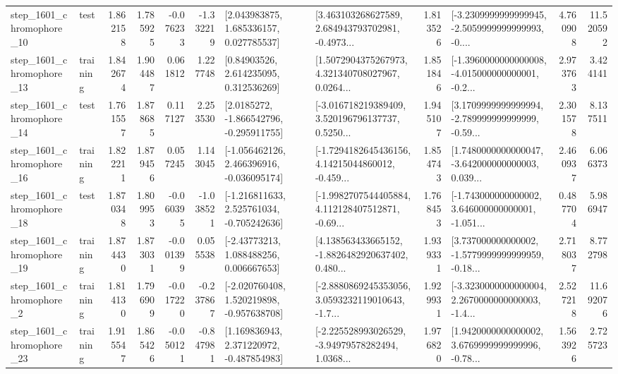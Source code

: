 \begin{tabular}{llrrrrllrlrr}
 step\_1601\_chromophore\_10 &      test &      1.862158 &    1.785925 &     -0.076233 & -1.332219 &     [2.043983875, 1.685336157, 0.027785537] &  [3.463103268627589, 2.684943793702981, -0.4973... &       1.813526 &  [-3.2309999999999945, -2.5059999999999993, -0.... &            4.760908 &         11.520592 \\
 step\_1601\_chromophore\_13 &  training &      1.842674 &    1.904487 &      0.061812 &  1.227748 &      [0.84903526, 2.614235095, 0.312536269] &  [1.5072904375267973, 4.321340708027967, 0.0264... &       1.851846 &  [-1.3960000000000008, -4.015000000000001, -0.2... &            2.973763 &          3.424141 \\
 step\_1601\_chromophore\_14 &      test &      1.761557 &    1.878685 &      0.117127 &  2.253530 &     [2.0185272, -1.866542796, -0.295911755] &  [-3.016718219389409, 3.520196796137737, 0.5250... &       1.945107 &  [3.1709999999999994, -2.789999999999999, -0.59... &            2.301578 &          8.137511 \\
 step\_1601\_chromophore\_16 &  training &      1.822211 &    1.879456 &      0.057245 &  1.143045 &   [-1.056462126, 2.466396916, -0.036095174] &  [-1.7294182645436156, 4.14215044860012, -0.459... &       1.854743 &  [1.7480000000000047, -3.642000000000003, 0.039... &            2.460937 &          6.066373 \\
 step\_1601\_chromophore\_18 &      test &      1.870348 &    1.809953 &     -0.060395 & -1.038521 &   [-1.216811633, 2.525761034, -0.705242636] &  [-1.9982707544405884, 4.112128407512871, -0.69... &       1.768453 &  [-1.743000000000002, 3.646000000000001, -1.051... &            0.487704 &          5.986947 \\
 step\_1601\_chromophore\_19 &  training &      1.874430 &    1.873031 &     -0.001399 &  0.055538 &     [-2.43773213, 1.088488256, 0.006667653] &  [4.138563433665152, -1.8826482920637402, 0.480... &       1.939331 &  [3.737000000000002, -1.5779999999999959, -0.18... &            2.718037 &          8.772798 \\
  step\_1601\_chromophore\_2 &  training &      1.814130 &    1.796909 &     -0.017220 & -0.237867 &   [-2.020760408, 1.520219898, -0.957638708] &  [-2.8880869245353056, 3.0593232119010643, -1.7... &       1.929931 &  [-3.3230000000000004, 2.2670000000000003, -1.4... &            2.527218 &         11.692076 \\
 step\_1601\_chromophore\_23 &  training &      1.915547 &    1.865426 &     -0.050121 & -0.847981 &    [1.169836943, 2.371220972, -0.487854983] &  [-2.225528993026529, -3.94979578282494, 1.0368... &       1.976820 &  [1.9420000000000002, 3.6769999999999996, -0.78... &            1.563926 &          2.725723 \\

\end{tabular}
